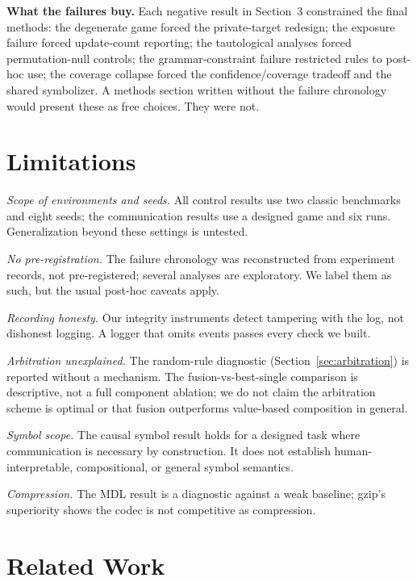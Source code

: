 \documentclass[11pt]{article}
\begin{document}
\textbf{What the failures buy.} Each negative result in Section~3 constrained the final methods: the degenerate game forced the private-target redesign; the exposure failure forced update-count reporting; the tautological analyses forced permutation-null controls; the grammar-constraint failure restricted rules to post-hoc use; the coverage collapse forced the confidence/coverage tradeoff and the shared symbolizer. A methods section written without the failure chronology would present these as free choices. They were not.

\section{Limitations}

\textit{Scope of environments and seeds.} All control results use two classic benchmarks and eight seeds; the communication results use a designed game and six runs. Generalization beyond these settings is untested.

\textit{No pre-registration.} The failure chronology was reconstructed from experiment records, not pre-registered; several analyses are exploratory. We label them as such, but the usual post-hoc caveats apply.

\textit{Recording honesty.} Our integrity instruments detect tampering with the log, not dishonest logging. A logger that omits events passes every check we built.

\textit{Arbitration unexplained.} The random-rule diagnostic (Section~\ref{sec:arbitration}) is reported without a mechanism. The fusion-vs-best-single comparison is descriptive, not a full component ablation; we do not claim the arbitration scheme is optimal or that fusion outperforms value-based composition in general.

\textit{Symbol scope.} The causal symbol result holds for a designed task where communication is necessary by construction. It does not establish human-interpretable, compositional, or general symbol semantics.

\textit{Compression.} The MDL result is a diagnostic against a weak baseline; gzip's superiority shows the codec is not competitive as compression.

\section{Related Work}
\end{document}
